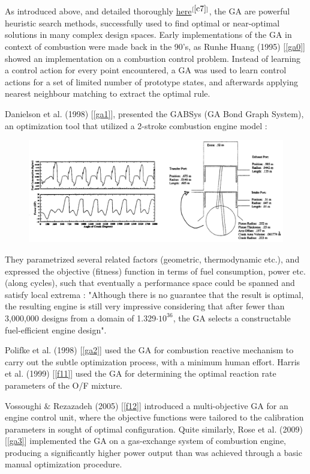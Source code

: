 \documentclass[12pt]{article}
\numberwithin{equation}{section}
\begin{document}
\begin{flushleft}
As introduced above, and detailed thoroughly \href{https://www.cs.colostate.edu/~genitor/MiscPubs/tutorial.pdf}{here}$^{[\ref{c7}]}$, the GA are powerful heuristic search methods, successfully used to find optimal or near-optimal solutions in many complex design spaces. Early implementations of the GA in context of combustion were made back in the 90's, as Runhe Huang (1995) [\ref{ga0}] showed an implementation on a combustion control problem. Instead of learning a control action for every point encountered, a GA was used to learn control actions for a set of limited number of prototype states, and afterwards applying nearest neighbour matching to extract the optimal rule. 

Danielson et al. (1998) [\ref{ga1}], presented the GABSys (GA Bond Graph System), an optimization tool that utilized a 2-stroke combustion engine model : 
\begin{figure}[H]
\centering
\includegraphics[width=0.915\linewidth, center]{engine.png}
\end{figure}
They parametrized several related factors (geometric, thermodynamic etc.), and expressed the objective (fitness) function in terms of fuel consumption, power etc. (along cycles), such that eventually a performance space could be spanned and satisfy local extrema : "Although there is no guarantee that the result is optimal, the resulting engine is still very impressive considering that after fewer than 3,000,000 designs from a domain of 1.329$\cdot 10^{36}$, the GA selects a constructable fuel-efficient engine design".

Polifke et al. (1998) [\ref{ga2}] used the GA for combustion reactive mechanism to carry out the subtle optimization process, with a minimum human effort. Harris et al. (1999) [\ref{f11}] used the GA for determining the optimal reaction rate parameters of the O/F mixture.

Vossoughi $\&$ Rezazadeh (2005) [\ref{f12}] introduced a multi-objective GA for an engine control unit, where the objective functions were tailored to the calibration parameters in sought of optimal configuration. Quite similarly, Rose et al. (2009) [\ref{ga3}] implemented the GA on a gas-exchange system of combustion engine, producing a significantly higher power output than was achieved through a basic manual optimization procedure. 


\end{flushleft}
\end{document}
